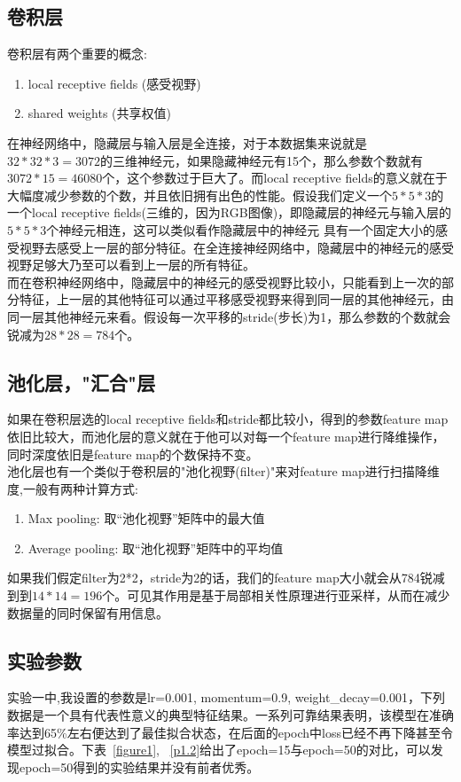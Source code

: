 \documentclass[a4paper,UTF8]{article}
\numberwithin{equation}{section}
\begin{document}
\begin{enumerate}[(1)]
	\subsection{卷积层}
	卷积层有两个重要的概念:
	\begin{enumerate}
		\item local receptive fields (感受视野)
		\item shared weights (共享权值)
	\end{enumerate}
	在神经网络中，隐藏层与输入层是全连接，对于本数据集来说就是$32*32*3=3072$的三维神经元，如果隐藏神经元有15个，那么参数个数就有$3072*15=46080$个，这个参数过于巨大了。而local receptive fields的意义就在于大幅度减少参数的个数，并且依旧拥有出色的性能。假设我们定义一个$5*5*3$的一个local receptive fields(三维的，因为RGB图像)，即隐藏层的神经元与输入层的$5*5*3$个神经元相连，这可以类似看作隐藏层中的神经元 具有一个固定大小的感受视野去感受上一层的部分特征。在全连接神经网络中，隐藏层中的神经元的感受视野足够大乃至可以看到上一层的所有特征。\\
	而在卷积神经网络中，隐藏层中的神经元的感受视野比较小，只能看到上一次的部分特征，上一层的其他特征可以通过平移感受视野来得到同一层的其他神经元，由同一层其他神经元来看。假设每一次平移的stride(步长)为1，那么参数的个数就会锐减为$28*28=784$个。
	
	\subsection{池化层，"汇合"层}
	如果在卷积层选的local receptive fields和stride都比较小，得到的参数feature map依旧比较大，而池化层的意义就在于他可以对每一个feature map进行降维操作，同时深度依旧是feature map的个数保持不变。\\
	池化层也有一个类似于卷积层的"池化视野(filter)"来对feature map进行扫描降维度,一般有两种计算方式:
	\begin{enumerate}
		\item Max pooling: 取“池化视野”矩阵中的最大值
		\item Average pooling: 取“池化视野”矩阵中的平均值
	\end{enumerate}
	如果我们假定filter为2*2，stride为2的话，我们的feature map大小就会从784锐减到到$14*14=196$个。可见其作用是基于局部相关性原理进行亚采样，从而在减少数据量的同时保留有用信息。
	
	\subsection{实验参数}
	实验一中,我设置的参数是lr=0.001, momentum=0.9, weight\_decay=0.001，下列数据是一个具有代表性意义的典型特征结果。一系列可靠结果表明，该模型在准确率达到65\%左右便达到了最佳拟合状态，在后面的epoch中loss已经不再下降甚至令模型过拟合。下表~\ref{figure1}, ~\ref{p1.2}给出了epoch=15与epoch=50的对比，可以发现epoch=50得到的实验结果并没有前者优秀。\\
	

\end{enumerate}
\end{document}
